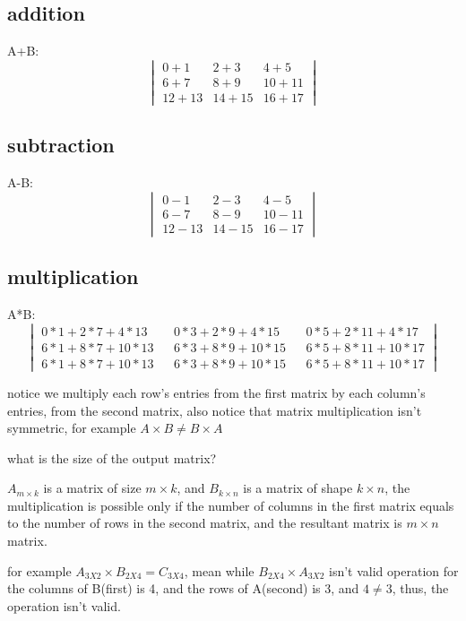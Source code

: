 \documentclass[4apaper,12pt]{book}
\begin{document}
\begin{description}
\begin{description}
        \subsection{addition}
        \item A+B:
          \begin{equation} \begin{vmatrix}0+1&2+3&4+5\\6+7&8+9&10+11\\12+13&14+15&16+17\end{vmatrix}\end{equation}

        \subsection{subtraction}
        \item A-B:
          \begin{equation} \begin{vmatrix}0-1&2-3&4-5\\6-7&8-9&10-11\\12-13&14-15&16-17\end{vmatrix}\end{equation}
        \subsection{multiplication}
        \item A*B:
          \begin{equation} \begin{vmatrix}0*1+2*7+4*13&&0*3+2*9+4*15&&0*5+2*11+4*17\\6*1+8*7+10*13&&6*3+8*9+10*15&&6*5+8*11+10*17\\6*1+8*7+10*13&&6*3+8*9+10*15&&6*5+8*11+10*17\end{vmatrix} \end{equation}
        \item notice we multiply each row's entries from the first matrix by each column's entries, from the second matrix, also notice that matrix multiplication isn't symmetric, for example $A\times B\neq{B}\times A$
        \item what is the size of the output matrix?
        \item $A_{m\times k}$ is a matrix of size $m\times k$, and $B_{k\times n}$ is a matrix of shape $k\times n$, the multiplication is possible only if the number of columns in the first matrix equals to the number of rows in the second matrix, and the resultant matrix is $m\times n$ matrix.
        \item for example $A_{3X2}\times B_{2X4}=C_{3X4}$, mean while $B_{2X4} \times A_{3X2}$ isn't valid operation for the columns of B(first) is 4, and the rows of A(second) is 3, and $4\neq3$, thus, the operation isn't valid.


\end{description}
\end{description}
\end{document}
